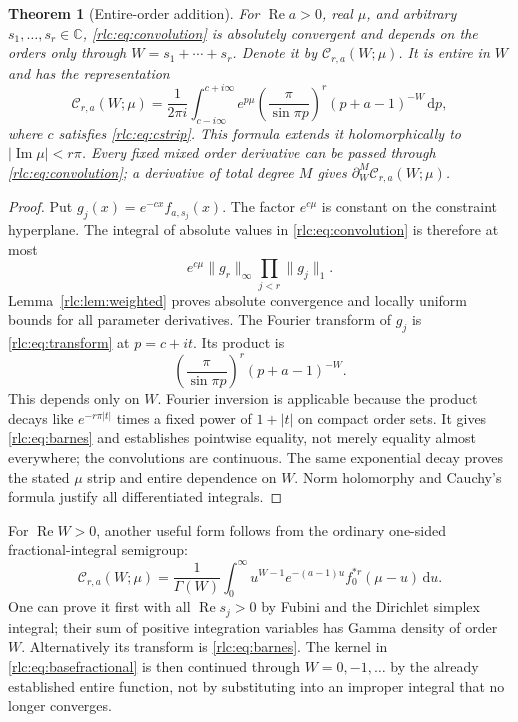 \documentclass[11pt,a4paper]{article}
\numberwithin{equation}{section}
\newtheorem{theorem}{Theorem}[section]
\theoremstyle{definition}\newtheorem{definition}[theorem]{Definition}
\theoremstyle{remark}\newtheorem{remark}[theorem]{Remark}
\DeclareMathOperator{\Rea}{Re}
\DeclareMathOperator{\Ima}{Im}
\newcommand{\dd}{\,\mathrm d}
\newcommand{\C}{\mathbb C}\newcommand{\R}{\mathbb R}\newcommand{\N}{\mathbb N}
\newcommand{\CC}{\mathcal C}
\begin{document}
\begin{theorem}[Entire-order addition]\label{rlc:thm:addition}
For $\Rea a>0$, real $\mu$, and arbitrary $s_1,\ldots,s_r\in\C$,
\eqref{rlc:eq:convolution} is absolutely convergent and depends on the
orders only through $W=s_1+\cdots+s_r$. Denote it by $\CC_{r,a}(W;\mu)$.
It is entire in $W$ and has the representation
\begin{equation}\label{rlc:eq:barnes}
 \CC_{r,a}(W;\mu)=\frac1{2\pi i}\int_{c-i\infty}^{c+i\infty}
 e^{p\mu}\left(\frac{\pi}{\sin\pi p}\right)^r
 (p+a-1)^{-W}\dd p,
\end{equation}
where $c$ satisfies \eqref{rlc:eq:cstrip}. This formula extends it
holomorphically to $|\Ima\mu|<r\pi$.
Every fixed mixed order derivative can be passed through
\eqref{rlc:eq:convolution}; a derivative of total degree $M$ gives
$\partial_W^M\CC_{r,a}(W;\mu)$.
\end{theorem}
\begin{proof}
Put $g_j(x)=e^{-cx}f_{a,s_j}(x)$. The factor $e^{c\mu}$ is constant
on the constraint hyperplane. The integral of absolute values in
\eqref{rlc:eq:convolution} is therefore at most
\[
 e^{c\mu}\|g_r\|_\infty\prod_{j<r}\|g_j\|_1.
\]
Lemma~\ref{rlc:lem:weighted} proves absolute convergence and locally
uniform bounds for all parameter derivatives. The Fourier transform of
$g_j$ is \eqref{rlc:eq:transform} at $p=c+it$. Its product is
\[
 \left(\frac{\pi}{\sin\pi p}\right)^r(p+a-1)^{-W}.
\]
This depends only on $W$. Fourier inversion is applicable because the
product decays like $e^{-r\pi|t|}$ times a fixed power of $1+|t|$ on
compact order sets. It gives \eqref{rlc:eq:barnes} and establishes
pointwise equality, not merely equality almost everywhere; the
convolutions are continuous. The same exponential decay proves the
stated $\mu$ strip and entire dependence on $W$. Norm holomorphy and
Cauchy's formula justify all differentiated integrals.
\end{proof}

For $\Rea W>0$, another useful form follows from the ordinary
one-sided fractional-integral semigroup:
\begin{equation}\label{rlc:eq:basefractional}
 \CC_{r,a}(W;\mu)=\frac1{\Gamma(W)}
 \int_0^\infty u^{W-1}e^{-(a-1)u}
           f_0^{*r}(\mu-u)\dd u.
\end{equation}
One can prove it first with all $\Rea s_j>0$ by Fubini and the
Dirichlet simplex integral; their sum of positive integration variables
has Gamma density of order $W$. Alternatively its transform is
\eqref{rlc:eq:barnes}. The kernel in
\eqref{rlc:eq:basefractional} is then continued through $W=0,-1,\ldots$
by the already established entire function, not by substituting into an
improper integral that no longer converges.
\end{document}

